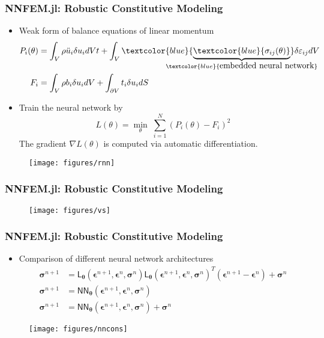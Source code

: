 \documentclass[usenames,dvipsnames]{beamer}
\newcommand{\ChoL}{\mathsf{L}}
\newcommand{\bt}[0]{\bm{\theta}}
\begin{document}
\begin{frame}
	\frametitle{NNFEM.jl: Robustic Constitutive Modeling}
	\begin{itemize}
	 \item Weak form of balance equations of linear momentum 
	{\footnotesize
	\begin{align*}
		P_i(\theta) &= \int_V \rho \ddot u_i \delta u_i dVt + \int_{V} \textcolor{blue}{\underbrace{\textcolor{blue}{\sigma_{ij}(\theta)}}_{\mathclap{\textcolor{blue}{\mbox{embedded neural network}}}}} \delta \varepsilon_{ij}dV\\
		F_i &= \int_{V}\rho b_i \delta u_i dV + \int_{\partial V} t_i\delta u_idS
	\end{align*}
	}
	\item Train the neural network by 
	{\scriptsize $$\boxed{L(\theta) = \min_{\theta}\;\sum_{i=1}^N(P_i(\theta) - F_i)^2}$$}
	The gradient $\nabla L(\theta)$ is computed via automatic differentiation.
	\end{itemize}
	\begin{figure}[hbt]
  \texttt{[image: figures/rnn]}
\end{figure}

\end{frame}

\begin{frame}
	\frametitle{NNFEM.jl: Robustic Constitutive Modeling}
\begin{figure}[hbt]
  \texttt{[image: figures/vs]}
\end{figure}
\end{frame}


\begin{frame}
	\frametitle{NNFEM.jl: Robustic Constitutive Modeling}
	\begin{itemize}
		\item Comparison of different neural network architectures 
		\begin{align*}
			\bm\sigma^{n+1} &= \ChoL_{\bt}(\bm\epsilon^{n+1},\bm{\epsilon}^{n},\bm{\sigma}^{n}) \ChoL_{\bt}(\bm\epsilon^{n+1},\bm{\epsilon}^{n},\bm{\sigma}^{n})^T (\bm{\epsilon}^{n+1} - \bm{\epsilon}^{n})  + \bm{\sigma}^{n} \\
			\bm{\sigma}^{n+1} &=  \mathsf{NN}_{\bt}(\bm\epsilon^{n+1},\bm{\epsilon}^{n},\bm{\sigma}^{n})\\
			\bm{\sigma}^{n+1} &=  \mathsf{NN}_{\bt}(\bm\epsilon^{n+1},\bm{\epsilon}^{n},\bm{\sigma}^{n}) + \bm{\sigma}^{n}
		\end{align*}
	\end{itemize}
\begin{figure}[hbt]
  \texttt{[image: figures/nncons]}
\end{figure}
\end{frame}
\end{document}
